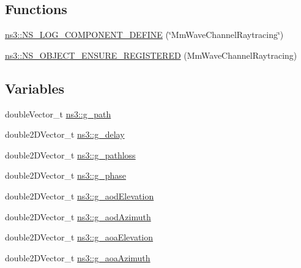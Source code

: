\subsection*{Functions}
\begin{DoxyCompactItemize}
\item 
\hyperlink{namespacens3_a27702d937e53d38c4c9427293a87ddb9}{ns3\+::\+N\+S\+\_\+\+L\+O\+G\+\_\+\+C\+O\+M\+P\+O\+N\+E\+N\+T\+\_\+\+D\+E\+F\+I\+NE} (\char`\"{}Mm\+Wave\+Channel\+Raytracing\char`\"{})
\item 
\hyperlink{namespacens3_ae86deebdba99fa358e646b83ebca671f}{ns3\+::\+N\+S\+\_\+\+O\+B\+J\+E\+C\+T\+\_\+\+E\+N\+S\+U\+R\+E\+\_\+\+R\+E\+G\+I\+S\+T\+E\+R\+ED} (Mm\+Wave\+Channel\+Raytracing)
\end{DoxyCompactItemize}
\subsection*{Variables}
\begin{DoxyCompactItemize}
\item 
double\+Vector\+\_\+t \hyperlink{namespacens3_aa9bd92de8f4cfc681e22ff5b45e141c6}{ns3\+::g\+\_\+path}
\item 
double2\+D\+Vector\+\_\+t \hyperlink{namespacens3_a9ae8878579236b1567aca15ee5d820b7}{ns3\+::g\+\_\+delay}
\item 
double2\+D\+Vector\+\_\+t \hyperlink{namespacens3_a7393b978973ee32cbf20a99c193f3aa7}{ns3\+::g\+\_\+pathloss}
\item 
double2\+D\+Vector\+\_\+t \hyperlink{namespacens3_a9cf5be6b6a45b7a18d9f31e3ccfa3092}{ns3\+::g\+\_\+phase}
\item 
double2\+D\+Vector\+\_\+t \hyperlink{namespacens3_a886ae3f6e0e8310edc1666e886d04201}{ns3\+::g\+\_\+aod\+Elevation}
\item 
double2\+D\+Vector\+\_\+t \hyperlink{namespacens3_a4500423074c7fcc93c888d3285c15f7b}{ns3\+::g\+\_\+aod\+Azimuth}
\item 
double2\+D\+Vector\+\_\+t \hyperlink{namespacens3_a8c7d43868bcbe7751105fb0481332145}{ns3\+::g\+\_\+aoa\+Elevation}
\item 
double2\+D\+Vector\+\_\+t \hyperlink{namespacens3_a1ff84afca167d02e77c1d89872d1c88d}{ns3\+::g\+\_\+aoa\+Azimuth}
\end{DoxyCompactItemize}
